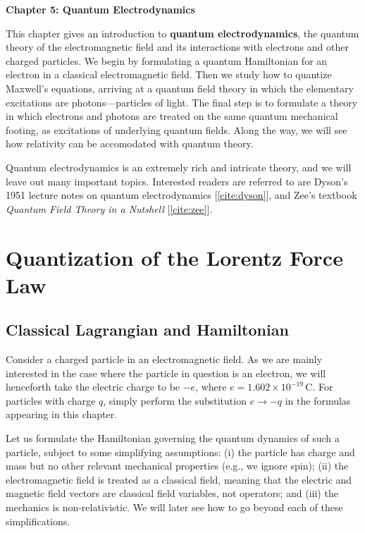 \documentclass[prx,12pt]{revtex4-2}
\begin{document}
\setcounter{page}{90}

\begin{center}
{\Large \textbf{Chapter 5: Quantum Electrodynamics}}
\end{center}


This chapter gives an introduction to \textbf{quantum
  electrodynamics}, the quantum theory of the electromagnetic field
and its interactions with electrons and other charged particles.  We
begin by formulating a quantum Hamiltonian for an electron in a
classical electromagnetic field.  Then we study how to quantize
Maxwell's equations, arriving at a quantum field theory in which the
elementary excitations are photons---particles of light.  The final
step is to formulate a theory in which electrons and photons are
treated on the same quantum mechanical footing, as excitations of
underlying quantum fields.  Along the way, we will see how relativity
can be accomodated with quantum theory.

Quantum electrodynamics is an extremely rich and intricate theory, and
we will leave out many important topics.  Interested readers are
referred to are Dyson's 1951 lecture notes on quantum electrodynamics
[\ref{cite:dyson}], and Zee's textbook \textit{Quantum Field Theory in
  a Nutshell} [\ref{cite:zee}].

\section{Quantization of the Lorentz Force Law}

\subsection{Classical Lagrangian and Hamiltonian}
\label{sec:nonrel}

Consider a charged particle in an electromagnetic field.  As we are
mainly interested in the case where the particle in question is an
electron, we will henceforth take the electric charge to be $-e$,
where $e = 1.602\times10^{-19}\,\mathrm{C}$.  For particles with
charge $q$, simply perform the substitution $e \rightarrow -q$ in the
formulas appearing in this chapter.

Let us formulate the Hamiltonian governing the quantum dynamics of
such a particle, subject to some simplifying assumptions: (i) the
particle has charge and mass but no other relevant mechanical
properties (e.g., we ignore spin); (ii) the electromagnetic field is
treated as a classical field, meaning that the electric and magnetic
field vectors are classical field variables, not operators; and (iii)
the mechanics is non-relativistic.  We will later see how to go beyond
each of these simplifications.
\end{document}
